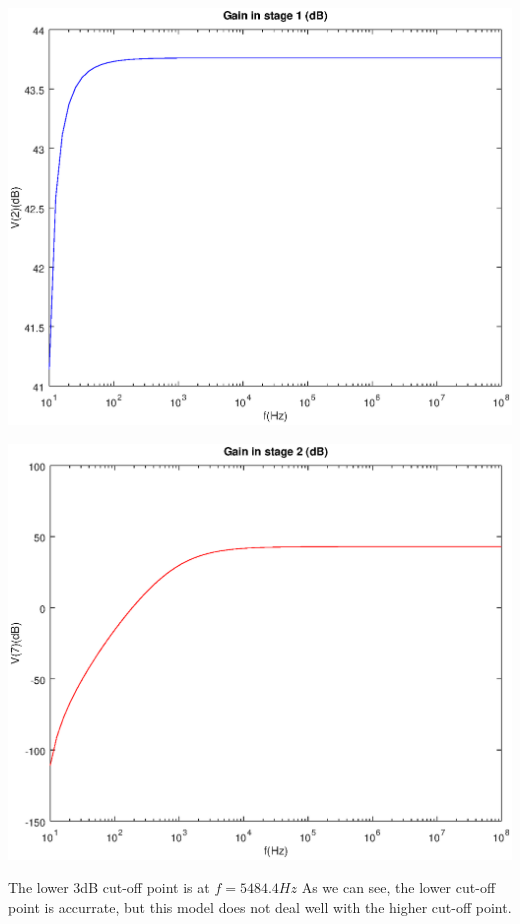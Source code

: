 \includegraphics[width=1\linewidth]{vo1.eps}

\includegraphics[width=1\linewidth]{vo2.eps}

The lower 3dB cut-off point is at $f=5484.4 Hz$
As we can see, the lower cut-off point is accurrate, but this model does not deal well with the higher cut-off point.
